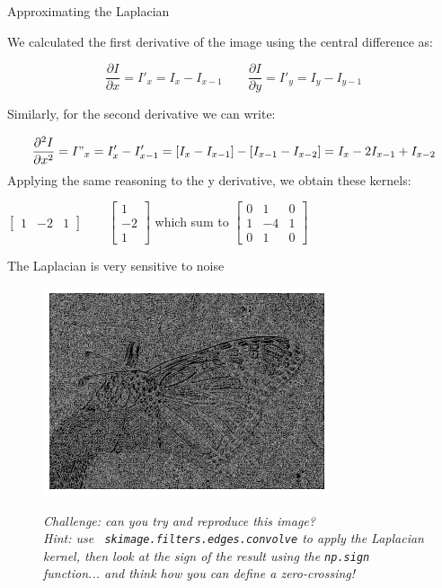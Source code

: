 \documentclass[9pt, aspectratio=169]{beamer}
\begin{document}
\begin{frame}
    {Approximating the Laplacian}

    We calculated the first derivative of the image using the central difference as:

    \Large
    $$\frac{\partial I}{\partial x} = I'_x = I_x - I_{x-1} \qquad \frac{\partial I}{\partial y} = I'_y = I_y - I_{y-1}$$

    \pause
    \normalsize
    Similarly, for the second derivative we can write:

    \Large
    $$\frac{\partial^2 I}{\partial x^2} = I"_x = I'_x - I'_{x-1} = [I_x - I_{x-1}] - [I_{x-1} - I_{x-2}] = I_x - 2I_{x-1} + I_{x-2}$$
    \pause
    \normalsize
    Applying the same reasoning to the y derivative, we obtain these kernels:

    \centering

    $\begin{bmatrix}
            1 & -2 & 1
        \end{bmatrix}
        \qquad
        \begin{bmatrix}
            1  \\
            -2 \\
            1
        \end{bmatrix}
    $
    which sum to  $\begin{bmatrix}
            0 & 1  & 0 \\
            1 & -4 & 1 \\
            0 & 1  & 0
        \end{bmatrix}$
\end{frame}

\begin{frame}
    {The Laplacian is very sensitive to noise}
    \begin{figure}
        \includegraphics[width=.5\textwidth]{laplacian_zero_crossing_no_smooth.png}
        \caption{\small{\color{gray}{Zero crossing of the Laplacian of our butterfly image}\color{black}}}
        \pause
        \textit{Challenge: can you try and reproduce this image?\\ Hint: use \texttt{ skimage.filters.edges.convolve} to apply the Laplacian kernel, then look at the sign of the result using the \texttt{np.sign} function... and think how you can define a zero-crossing!}
    \end{figure}
\end{frame}
\end{document}
